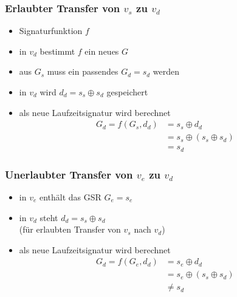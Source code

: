 \documentclass[mathserif,slidestop,compress,red]{beamer}
\begin{document}
\begin{frame}
  \frametitle{Erlaubter Transfer von $v_s$ zu $v_d$}
  \begin{itemize}
    \pause
    \item Signaturfunktion $f$
    \item in $v_d$ bestimmt $f$ ein neues $G$
    \pause
    \item aus $G_s$ muss ein passendes $G_d = s_d$ werden
    \pause
    \item in $v_d$ wird $d_d = s_s \oplus s_d$ gespeichert
    \pause
    \item als neue Laufzeitsignatur wird berechnet
    \begin{align*}
    G_d = f(G_s, d_d) &= s_s \oplus d_d \\
    &= s_s \oplus ( s_s \oplus s_d ) \\
    &= s_d
    \end{align*}
  \end{itemize}
\end{frame}

\begin{frame}
  \frametitle{Unerlaubter Transfer von $v_e$ zu $v_d$}
  \begin{itemize}
    \pause
    \item in $v_e$ enthält das GSR $G_e = s_e$
    \pause
    \item in $v_d$ steht $d_d = s_s \oplus s_d$ \\
          (für erlaubten Transfer von $v_s$ nach $v_d$)
    \pause
    \item als neue Laufzeitsignatur wird berechnet
    \begin{align*}
    G_d = f(G_e, d_d) &= s_e \oplus d_d \\
    &= s_e \oplus ( s_s \oplus s_d ) \\
    &\neq s_d
    \end{align*}
  \end{itemize}
\end{frame}
\end{document}
